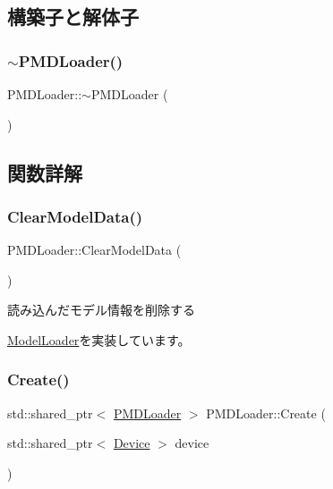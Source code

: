 \subsection{構築子と解体子}
\mbox{\label{class_p_m_d_loader_a9a784c2a2700ee01b6c1e8139a876fa1}} 
\subsubsection{\texorpdfstring{$\sim$\+P\+M\+D\+Loader()}{~PMDLoader()}}
{\footnotesize\ttfamily P\+M\+D\+Loader\+::$\sim$\+P\+M\+D\+Loader (\begin{DoxyParamCaption}{ }\end{DoxyParamCaption})}



\subsection{関数詳解}
\mbox{\label{class_p_m_d_loader_abdb6e537aef759341dfc62cd1038539c}} 
\subsubsection{\texorpdfstring{Clear\+Model\+Data()}{ClearModelData()}}
{\footnotesize\ttfamily P\+M\+D\+Loader\+::\+Clear\+Model\+Data (\begin{DoxyParamCaption}{ }\end{DoxyParamCaption})\hspace{0.3cm}{\ttfamily [virtual]}}

読み込んだモデル情報を削除する 

\mbox{\hyperlink{class_model_loader_a6662edd78b17eeead09e822e19fc1799}{Model\+Loader}}を実装しています。

\mbox{\label{class_p_m_d_loader_a82a5b173f9f2e05662174452cfde5578}} 
\subsubsection{\texorpdfstring{Create()}{Create()}}
{\footnotesize\ttfamily std\+::shared\+\_\+ptr$<$ \mbox{\hyperlink{class_p_m_d_loader}{P\+M\+D\+Loader}} $>$ P\+M\+D\+Loader\+::\+Create (\begin{DoxyParamCaption}\item[{std\+::shared\+\_\+ptr$<$ \mbox{\hyperlink{class_device}{Device}} $>$}]{device }\end{DoxyParamCaption})\hspace{0.3cm}{\ttfamily [static]}}

